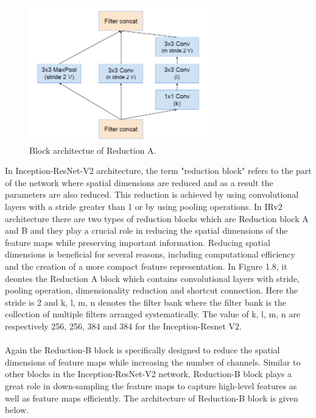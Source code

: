 \documentclass[a4paper,12pt,oneside]{book}
\begin{document}
\begin{figure}[!hbtp]
\centering
\includegraphics[width=0.7\textwidth]{Figures/reduction_A.png}
\captionsetup{font=small}
\caption{Block architectue of Reduction A.}
\label{fig:redA}
\end{figure}
\newpage
In Inception-ResNet-V2 architecture, the term "reduction block" refers to the part of the network where spatial dimensions are reduced and as a result the parameters are also reduced. This reduction is achieved by using convolutional layers with a stride greater than 1 or by using pooling operations. In IRv2 architecture there are two types of reduction blocks which are Reduction block A and B and they play a crucial role in reducing the spatial dimensions of the feature maps while preserving important information. Reducing spatial dimensions is beneficial for several reasons, including computational efficiency and the creation of a more compact feature representation.
In Figure 1.8, it deontes the Reduction A block which contains convolutional 
layers with stride, pooling operation, dimensionality reduction and shortcut connection. Here the stride is 2 and k, l, m, n denotes the filter bank where the filter bank is the collection of multiple filters arranged systematically. The value of k, l, m, n are respectively 256, 256, 384 and 384 for the Inception-Resnet V2.\\\\
Again the Reduction-B block is specifically designed to reduce the spatial dimensions of feature maps while increasing the number of channels. Similar to other blocks in the Inception-ResNet-V2 network, Reduction-B block plays a great role in down-sampling the feature maps to capture high-level features as well as feature maps efficiently. The architecture of Reduction-B block is given below.\\
\end{document}
